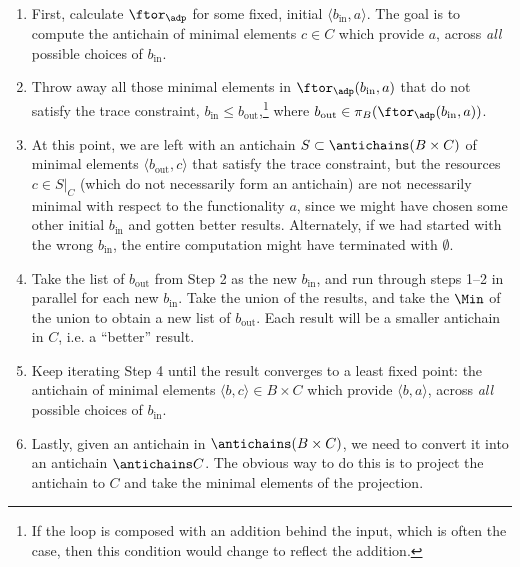 \begin{enumerate}
    \item First, calculate $\ftor_\adp$ for some fixed, initial $\langle b_{\text{in}},a \rangle$. The goal is to compute the antichain of minimal elements $c \in C$ which provide $a$, across \emph{all} possible choices of $b_{\text{in}}$.
    \item Throw away all those minimal elements in $\ftor_\adp(b_{\text{in}},a)$ that do not satisfy the trace constraint, $b_{\text{in}} \leq b_{\text{out}}$,\footnote{If the loop is composed with an addition behind the input, which is often the case, then this condition would change to reflect the addition.} where $b_{\text{out}} \in \pi_B(\ftor_\adp(b_{\text{in}},a))$.
    \item At this point, we are left with an antichain $S \subset \antichains (B \times C)$ of minimal elements $\langle b_{\text{out}},c \rangle$ that satisfy the trace constraint, but the resources $c \in S|_C$ (which do not necessarily form an antichain) are not necessarily minimal with respect to the functionality $a$, since we might have chosen some other initial $b_{\text{in}}$ and gotten better results. Alternately, if we had started with the wrong $b_{\text{in}}$, the entire computation might have terminated with $\emptyset$.
    \item Take the list of $b_{\text{out}}$ from Step 2 as the new $b_{\text{in}}$, and run through steps 1--2 in parallel for each new $b_{\text{in}}$. Take the union of the results, and take the $\Min$ of the union to obtain a new list of $b_{\text{out}}$. Each result will be a smaller antichain in $C$, i.e. a ``better'' result.
    \item Keep iterating Step 4 until the result converges to a least fixed point: the antichain of minimal elements $\langle b, c \rangle \in B \times C$ which provide $\langle b, a \rangle$, across \emph{all} possible choices of $b_{\text{in}}$.
    \item Lastly, given an antichain in $\antichains (B\times C)$, we need to convert it into an antichain $\antichains C$. The obvious way to do this is to project the antichain to $C$ and take the minimal elements of the projection.


\end{enumerate}

